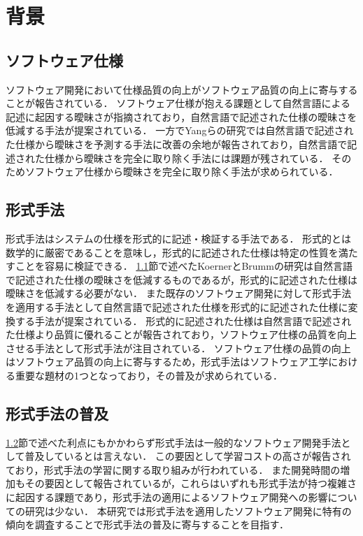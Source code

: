 \documentclass[main]{subfiles}
\begin{document}
\chapter{背景}

\section{ソフトウェア仕様}
\label{sec:specification}

ソフトウェア開発において仕様品質の向上がソフトウェア品質の向上に寄与することが報告されている\cite{knauss:2009}．
ソフトウェア仕様が抱える課題として自然言語による記述に起因する曖昧さが指摘されており\cite{kamsties:2005}，自然言語で記述された仕様の曖昧さを低減する手法が提案されている\cite{korner:2009,yang:2011}．
一方でYangらの研究\cite{yang:2011}では自然言語で記述された仕様から曖昧さを予測する手法に改善の余地が報告されており，自然言語で記述された仕様から曖昧さを完全に取り除く手法には課題が残されている．
そのためソフトウェア仕様から曖昧さを完全に取り除く手法が求められている．

\section{形式手法}
\label{sec:formal-method}

形式手法はシステムの仕様を形式的に記述・検証する手法である．
形式的とは数学的に厳密であることを意味し，形式的に記述された仕様は特定の性質を満たすことを容易に検証できる．
\ref{sec:specification}節で述べたKoernerとBrummの研究\cite{korner:2009}は自然言語で記述された仕様の曖昧さを低減するものであるが，形式的に記述された仕様は曖昧さを低減する必要がない．
また既存のソフトウェア開発に対して形式手法を適用する手法として自然言語で記述された仕様を形式的に記述された仕様に変換する手法が提案されている\cite{ilieva:2005}．
形式的に記述された仕様は自然言語で記述された仕様より品質に優れることが報告されており\cite{fabbrini:2001}，ソフトウェア仕様の品質を向上させる手法として形式手法が注目されている．%
ソフトウェア仕様の品質の向上はソフトウェア品質の向上に寄与するため，形式手法はソフトウェア工学における重要な題材の1つとなっており，その普及が求められている．

\section{形式手法の普及}

\ref{sec:formal-method}節で述べた利点にもかかわらず形式手法は一般的なソフトウェア開発手法として普及しているとは言えない．
この要因として学習コストの高さが報告されており\cite{kurita:2011}，形式手法の学習に関する取り組みが行われている\cite{ohnishi:2020,araki:2010,araki:2011}．
また開発時間の増加もその要因として報告されている\cite{kitamura:2021}が，これらはいずれも形式手法が持つ複雑さに起因する課題であり，形式手法の適用によるソフトウェア開発への影響についての研究は少ない．
本研究では形式手法を適用したソフトウェア開発に特有の傾向を調査することで形式手法の普及に寄与することを目指す．
\end{document}
